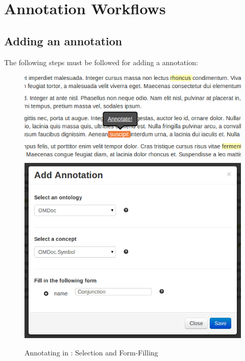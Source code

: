 \section{Annotation Workflows}

\subsection{Adding an annotation}

The following steps must be followed for adding a \KAT annotation:
\begin{figure}[ht]\centering
  \includegraphics[width=.57\textwidth]{../PIC/annotate}\quad
  \includegraphics[width=.37\textwidth]{../PIC/add-symbol}
  \caption{Annotating in \KAT: Selection and Form-Filling}\label{fig:kat-annotate}
\end{figure}

